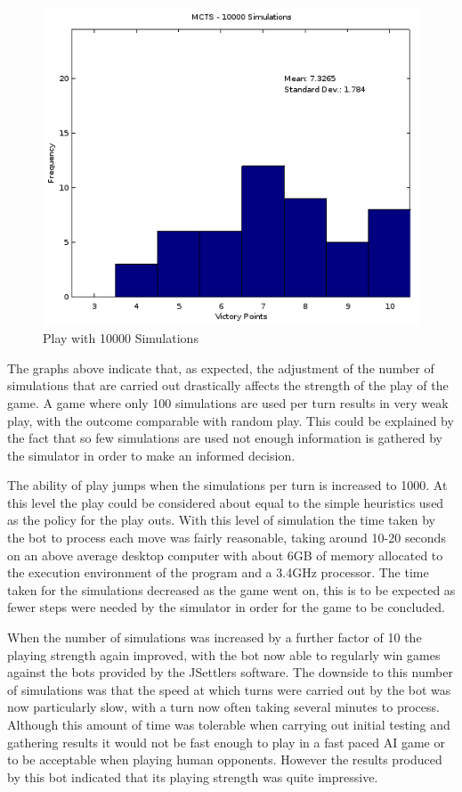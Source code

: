 \documentclass[]{article}
\begin{document}
\begin{center}
\begin{figure}[H]
 \centerline{\includegraphics[width=0.75\linewidth]{figures/mcts10000}}
  \caption{Play with 10000 Simulations}
  \label{fig:mcts10000} 
\end{figure}
\end{center}

\par The graphs above indicate that, as expected, the adjustment of the number of simulations that are carried out drastically affects the strength of the play of the game. A game where only 100 simulations are used per turn results in very weak play, with the outcome comparable with random play. This could be explained by the fact that so few simulations are used not enough information is gathered by the simulator in order to make an informed decision. 

\par The ability of play jumps when the simulations per turn is increased to 1000. At this level the play could be considered about equal to the simple heuristics used as the policy for the play outs. With this level of simulation the time taken by the bot to process each move was fairly reasonable, taking around 10-20 seconds on an above average desktop computer with about 6GB of memory allocated to the execution environment of the program and a 3.4GHz processor. The time taken for the simulations decreased as the game went on, this is to be expected as fewer steps were needed by the simulator in order for the game to be concluded.

\par When the number of simulations was increased by a further factor of 10 the playing strength again improved, with the bot now able to regularly win games against the bots provided by the JSettlers software. The downside to this number of simulations was that the speed at which turns were carried out by the bot was now particularly slow, with a turn now often taking several minutes to process. Although this amount of time was tolerable when carrying out initial testing and gathering results it would not be fast enough to play in a fast paced AI game or to be acceptable when playing human opponents. However the results produced by this bot indicated that its playing strength was quite impressive.
\end{document}
